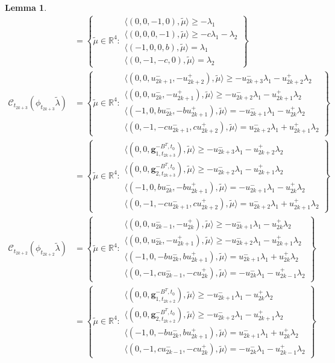 \documentclass{amsart}
\newtheorem{lemma}[theorem]{Lemma}
\numberwithin{theorem}{section}
\newcommand{\bfg}{\boldsymbol{g}}
\newcommand{\cC}{\mathcal{C}}
\newcommand{\RR}{\mathbb{R}}
\begin{document}
\begin{lemma}
\begin{align*}
      &=
      \left\{\tilde\mu\in\RR^4:
      \substack{
        \langle(0,0,-1,0),\tilde\mu\rangle\ge -\lambda_1\\
        \langle(0,0,0,-1),\tilde\mu\rangle\ge -c\lambda_1-\lambda_2\\
        \langle(-1,0,0,b),\tilde\mu\rangle=\lambda_1\\
        \langle(0,-1,-c,0),\tilde\mu\rangle=\lambda_2
      }\right\}\\
      \cC_{t_{2k+3}}(\phi_{t_{2k+3}}\tilde\lambda)
      &=
      \left\{\tilde\mu\in\RR^4:
      \substack{
        \langle(0,0,u^-_{2k+1},-u^+_{2k+2}),\tilde\mu\rangle\ge -u^-_{2k+3}\lambda_1-u^+_{2k+2}\lambda_2\\
        \langle(0,0,u^-_{2k},-u^+_{2k+1}),\tilde\mu\rangle\ge -u^-_{2k+2}\lambda_1-u^+_{2k+1}\lambda_2\\
        \langle(-1,0,bu^-_{2k},-bu^+_{2k+1}),\tilde\mu\rangle=-u^-_{2k+1}\lambda_1-u^+_{2k}\lambda_2\\
        \langle(0,-1,-cu^-_{2k+1},cu^+_{2k+2}),\tilde\mu\rangle=u^-_{2k+2}\lambda_1+u^+_{2k+1}\lambda_2
      }\right\}\\
      &=
      \left\{\tilde\mu\in\RR^4:
      \substack{
        \langle(0,0,\bfg^{-B^T,t_0}_{1,t_{2k+3}}),\tilde\mu\rangle\ge -u^-_{2k+3}\lambda_1-u^+_{2k+2}\lambda_2\\
        \langle(0,0,\bfg^{-B^T,t_0}_{2,t_{2k+3}}),\tilde\mu\rangle\ge -u^-_{2k+2}\lambda_1-u^+_{2k+1}\lambda_2\\
        \langle(-1,0,bu^-_{2k},-bu^+_{2k+1}),\tilde\mu\rangle=-u^-_{2k+1}\lambda_1-u^+_{2k}\lambda_2\\
        \langle(0,-1,-cu^-_{2k+1},cu^+_{2k+2}),\tilde\mu\rangle=u^-_{2k+2}\lambda_1+u^+_{2k+1}\lambda_2
      }\right\}\\
      \cC_{t_{2k+2}}(\phi_{t_{2k+2}}\tilde\lambda)
      &=
      \left\{\tilde\mu\in\RR^4:
      \substack{
        \langle(0,0,u^-_{2k-1},-u^+_{2k}),\tilde\mu\rangle\ge -u^-_{2k+1}\lambda_1-u^+_{2k}\lambda_2\\
        \langle(0,0,u^-_{2k},-u^+_{2k+1}),\tilde\mu\rangle\ge -u^-_{2k+2}\lambda_1-u^+_{2k+1}\lambda_2\\
        \langle(-1,0,-bu^-_{2k},bu^+_{2k+1}),\tilde\mu\rangle=u^-_{2k+1}\lambda_1+u^+_{2k}\lambda_2\\
        \langle(0,-1,cu^-_{2k-1},-cu^+_{2k}),\tilde\mu\rangle=-u^-_{2k}\lambda_1-u^+_{2k-1}\lambda_2
      }\right\}\\
      &=
      \left\{\tilde\mu\in\RR^4:
      \substack{
        \langle(0,0,\bfg^{-B^T,t_0}_{1,t_{2k+2}}),\tilde\mu\rangle\ge -u^-_{2k+1}\lambda_1-u^+_{2k}\lambda_2\\
        \langle(0,0,\bfg^{-B^T,t_0}_{2,t_{2k+2}}),\tilde\mu\rangle\ge -u^-_{2k+2}\lambda_1-u^+_{2k+1}\lambda_2\\
        \langle(-1,0,-bu^-_{2k},bu^+_{2k+1}),\tilde\mu\rangle=u^-_{2k+1}\lambda_1+u^+_{2k}\lambda_2\\
        \langle(0,-1,cu^-_{2k-1},-cu^+_{2k}),\tilde\mu\rangle=-u^-_{2k}\lambda_1-u^+_{2k-1}\lambda_2
      }\right\}
    \end{align*}
  \end{lemma}
\end{document}

